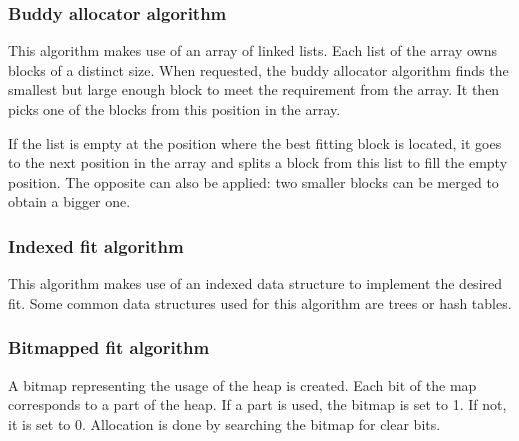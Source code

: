 \subsubsection{Buddy allocator algorithm}
This algorithm makes use of an array of linked lists.
Each list of the array owns blocks of a distinct size.
When requested, the buddy allocator algorithm finds the smallest but large enough block to meet the requirement from the array.
It then picks one of the blocks from this position in the array.

If the list is empty at the position where the best fitting block is located, it goes to the next position in the array
and splits a block from this list to fill the empty position.
The opposite can also be applied: two smaller blocks can be merged to obtain a bigger one.

\subsubsection{Indexed fit algorithm}
This algorithm makes use of an indexed data structure to implement the desired fit.
Some common data structures used for this algorithm are trees or hash tables.

\subsubsection{Bitmapped fit algorithm}
A bitmap representing the usage of the heap is created.
Each bit of the map corresponds to a part of the heap.
If a part is used, the bitmap is set to 1.
If not, it is set to 0.
Allocation is done by searching the bitmap for clear bits.


